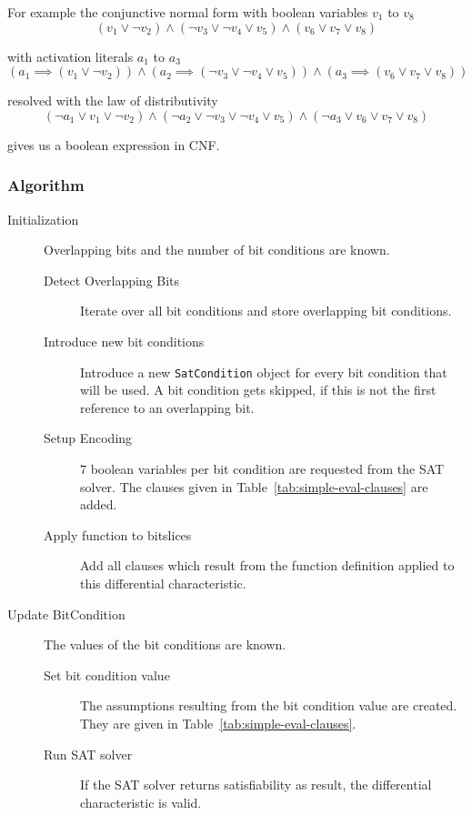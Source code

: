 For example the conjunctive normal form with boolean variables $v_1$ to $v_8$
%
\[
  (v_1 \lor \neg v_2) \land (\neg v_3 \lor \neg v_4 \lor v_5) \land
    (v_6 \lor v_7 \lor v_8)
\]

with activation literals $a_1$ to $a_3$
\[
  (a_1 \implies (v_1 \lor \neg v_2)) \land
    (a_2 \implies (\neg v_3 \lor \neg v_4 \lor v_5)) \land
    (a_3 \implies (v_6 \lor v_7 \lor v_8))
\]

resolved with the law of distributivity
\[
  (\neg a_1 \lor v_1 \lor \neg v_2) \land
    (\neg a_2 \lor \neg v_3 \lor \neg v_4 \lor v_5) \land
    (\neg a_3 \lor v_6 \lor v_7 \lor v_8)
\]

gives us a boolean expression in CNF.

\subsubsection{Algorithm}
\label{sec:activation-literals-algorithm}
%
\begin{description}
  \item[Initialization] Overlapping bits and the number of bit conditions are known.
    \begin{description}
      \item[Detect Overlapping Bits] Iterate over all bit conditions and store overlapping bit conditions.
      \item[Introduce new bit conditions] Introduce a new \texttt{SatCondition} object for every bit condition that will be used. A bit condition gets skipped, if this is not the first reference to an overlapping bit.
      \item[Setup Encoding] $7$ boolean variables per bit condition are requested from the SAT solver. The clauses given in Table~\ref{tab:simple-eval-clauses} are added.
      \item[Apply function to bitslices] Add all clauses which result from the function definition applied to this differential characteristic.
    \end{description}
  \item[Update BitCondition] The values of the bit conditions are known.
    \begin{description}
      \item[Set bit condition value] The assumptions resulting from the bit condition value are created. They are given in Table~\ref{tab:simple-eval-clauses}.
      \item[Run SAT solver] If the SAT solver returns satisfiability as result, the differential characteristic is valid.
    \end{description}
\end{description}

